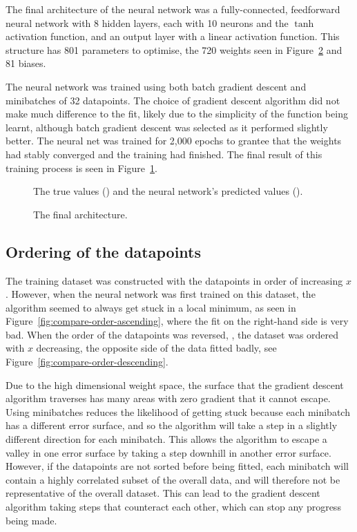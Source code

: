 The final architecture of the neural network was a fully-connected, feedforward neural network with 8 hidden layers, each with 10 neurons and the \(\tanh\) activation function, and an output layer with a linear activation function.
This structure has 801 parameters to optimise, the 720 weights seen in Figure~\ref{fig:final-ann-architecture} and 81 biases.

The neural network was trained using both batch gradient descent and minibatches of 32 datapoints.
The choice of gradient descent algorithm did not make much difference to the fit, likely due to the simplicity of the function being learnt, although batch gradient descent was selected as it performed slightly better.
The neural net was trained for 2,000 epochs to grantee that the weights had stably converged and the training had finished.
The final result of this training process is seen in Figure~\ref{fig:ann-preds}.

\begin{figure}[htbp]
	\centering
	
	\caption{The true values (\truthcolour) and the neural network's predicted values (\anncolour).}
	\label{fig:ann-preds}
\end{figure}

\begin{figure}[htbp]
	\centering
	
	\caption{The final architecture.}
	\label{fig:final-ann-architecture}
\end{figure}

\subsection{Ordering of the datapoints}

The training dataset was constructed with the datapoints in order of increasing \(x\).
However, when the neural network was first trained on this dataset, the algorithm seemed to always get stuck in a local minimum, as seen in Figure~\ref{fig:compare-order-ascending}, where the fit on the right-hand side is very bad.
When the order of the datapoints was reversed, \ie{}, the dataset was ordered with \(x\) decreasing, the opposite side of the data fitted badly, see Figure~\ref{fig:compare-order-descending}.

Due to the high dimensional weight space, the surface that the gradient descent algorithm traverses has many areas with zero gradient that it cannot escape.
Using minibatches reduces the likelihood of getting stuck because each minibatch has a different error surface, and so the algorithm will take a step in a slightly different direction for each minibatch.
This allows the algorithm to escape a valley in one error surface by taking a step downhill in another error surface.
However, if the datapoints are not sorted before being fitted, each minibatch will contain a highly correlated subset of the overall data, and will therefore not be representative of the overall dataset.
This can lead to the gradient descent algorithm taking steps that counteract each other, which can stop any progress being made.

